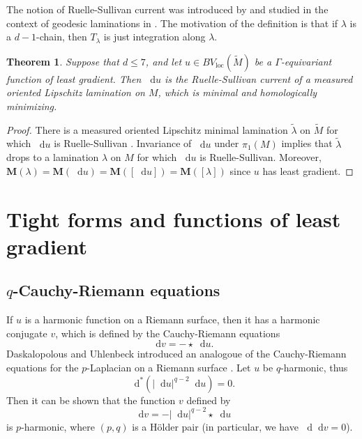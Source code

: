 \documentclass[reqno,11pt]{amsart}
\newcommand*\dif{\mathop{}\!\mathrm{d}}
\newcommand{\Mass}{\mathbf M}
\newcommand{\loc}{\mathrm{loc}}
\newtheorem{theorem}{Theorem}[section]
\theoremstyle{definition}
\numberwithin{equation}{section}
\begin{document}
The notion of Ruelle-Sullivan current was introduced by \cite{Ruelle75} and studied in the context of geodesic laminations in \cite[\S8]{daskalopoulos2020transverse}.
The motivation of the definition is that if $\lambda$ is a $d - 1$-chain, then $T_\lambda$ is just integration along $\lambda$.

\begin{theorem}\label{1 harmonic is MOML}
Suppose that $d \leq 7$, and let $u \in BV_\loc(\tilde M)$ be a $\Gamma$-equivariant function of least gradient.
Then $\dif u$ is the Ruelle-Sullivan current of a measured oriented Lipschitz lamination on $M$, which is minimal and homologically minimizing.
\end{theorem}
\begin{proof}
There is a measured oriented Lipschitz minimal lamination $\tilde \lambda$ on $\tilde M$ for which $\dif u$ is Ruelle-Sullivan \cite[Theorem B]{BackusCML}.
Invariance of $\dif u$ under $\pi_1(M)$ implies that $\tilde \lambda$ drops to a lamination $\lambda$ on $M$ for which $\dif u$ is Ruelle-Sullivan.
Moreover, $\Mass(\lambda) = \Mass(\dif u) = \Mass([\dif u]) = \Mass([\lambda])$ since $u$ has least gradient.
\end{proof}


\section{Tight forms and functions of least gradient}\label{tight forms sec}
\subsection{\texorpdfstring{$q$-Cauchy-Riemann}{q-Cauchy-Riemann} equations}
If $u$ is a harmonic function on a Riemann surface, then it has a harmonic conjugate $v$, which is defined by the Cauchy-Riemann equations 
$$\dif v = -\star \dif u.$$
Daskalopolous and Uhlenbeck introduced an analogoue of the Cauchy-Riemann equations for the $p$-Laplacian on a Riemann surface \cite[\S3]{daskalopoulos2020transverse}.
Let $u$ be $q$-harmonic, thus 
$$\dif^*(|\dif u|^{q - 2} \dif u) = 0.$$
Then it can be shown that the function $v$ defined by 
$$\dif v = -|\dif u|^{q - 2} \star \dif u$$
is $p$-harmonic, where $(p, q)$ is a H\"older pair (in particular, we have $\dif \dif v = 0$).
\end{document}

